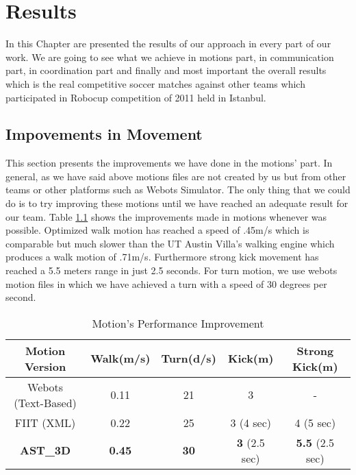 \chapter{Results}
\label{results}
In this Chapter are presented the results of our approach in every part of our work. We are going to see what we achieve in motions part, in communication part, in coordination part and finally and most important the overall results which is the real competitive soccer matches against other teams which participated in Robocup competition of 2011 held in Istanbul.

\section{Impovements in Movement}
This section presents the improvements we have done in the motions' part. In general, as we have said above motions files are not created by us but from other teams or other platforms such as Webots Simulator. The only thing that we could do is to try improving these motions until we have reached an adequate result for our team. Table \ref{MotionImprovements} shows the improvements made in motions whenever was possible. Optimized walk motion has reached a speed of .45m/s which is comparable but much slower than the UT Austin Villa's walking engine which produces a walk motion of .71m/s. Furthermore strong kick movement has reached a 5.5 meters range in just 2.5 seconds. For turn motion, we use webots motion files in which we have achieved a turn with a speed of 30 degrees per second. 

\begin{table}
\begin{center}
    \begin{tabular}{ | c | c | c | c | c |}
    \hline
    \textbf{Motion Version} 			& \textbf{Walk(m/s)} 			& \textbf{Turn(d/s)} 	& \textbf{Kick(m)} 	& \textbf{Strong Kick(m)} \\ \hline
    Webots (Text-Based) 		& 0.11 				& 21 				& 3 				& - \\ \hline	
    FIIT (XML)				& 0.22 				& 25 				& 3 (4 sec) 		& 4 (5 sec) \\ \hline
    \textbf{AST\_3D} 		&  \textbf{0.45} 	& \textbf{30} 		& \textbf{3} (2.5 sec)& \textbf{5.5} (2.5 sec) \\
    \hline
    \end{tabular}
\end{center}
\label{MotionImprovements}
\caption{Motion's Performance Improvement}
\end{table}


